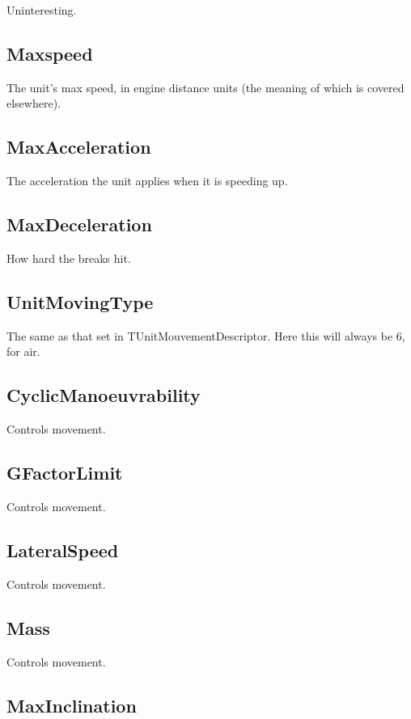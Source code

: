 \documentclass{article}
\begin{document}
Uninteresting.

\subsection{Maxspeed}

The unit's max speed, in engine distance units (the meaning of which is covered elsewhere).

\subsection{MaxAcceleration}

The acceleration the unit applies when it is speeding up.

\subsection{MaxDeceleration}

How hard the breaks hit.

\subsection{UnitMovingType}

The same as that set in TUnitMouvementDescriptor. Here this will always be 6, for air.

\subsection{CyclicManoeuvrability}

Controls movement.

\subsection{GFactorLimit}

Controls movement.

\subsection{LateralSpeed}

Controls movement.

\subsection{Mass}

Controls movement.

\subsection{MaxInclination}
\end{document}
